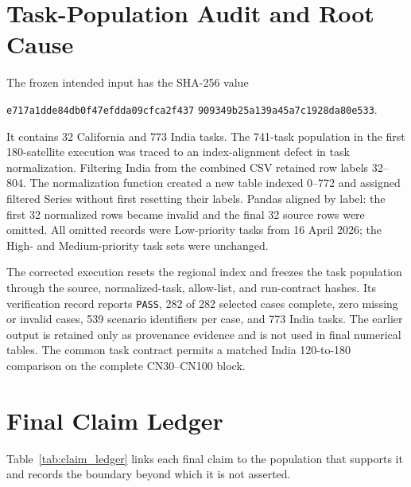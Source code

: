 \section{Task-Population Audit and Root Cause}

The frozen intended input has the SHA-256 value
\begin{center}
\small\texttt{e717a1dde84db0f47efdda09cfca2f437}\linebreak
\texttt{909349b25a139a45a7c1928da80e533}.
\end{center}
It contains 32 California and 773 India tasks. The 741-task population in the first 180-satellite execution was traced to an index-alignment defect in task normalization. Filtering India from the combined CSV retained row labels 32--804. The normalization function created a new table indexed 0--772 and assigned filtered Series without first resetting their labels. Pandas aligned by label: the first 32 normalized rows became invalid and the final 32 source rows were omitted. All omitted records were Low-priority tasks from 16 April 2026; the High- and Medium-priority task sets were unchanged.

The corrected execution resets the regional index and freezes the task population through the source, normalized-task, allow-list, and run-contract hashes. Its verification record reports \texttt{PASS}, 282 of 282 selected cases complete, zero missing or invalid cases, 539 scenario identifiers per case, and 773 India tasks. The earlier output is retained only as provenance evidence and is not used in final numerical tables. The common task contract permits a matched India 120-to-180 comparison on the complete CN30--CN100 block.

\section{Final Claim Ledger}

Table~\ref{tab:claim_ledger} links each final claim to the population that supports it and records the boundary beyond which it is not asserted.

